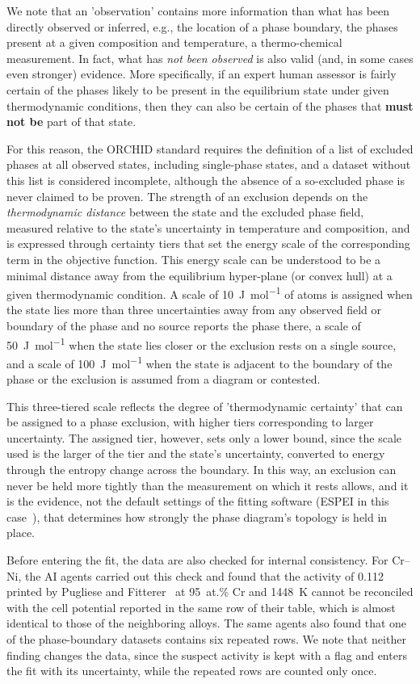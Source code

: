 We note that an 'observation' contains more information than what has been directly observed or inferred, e.g., the location of a phase boundary, the phases present at a given composition and temperature, a thermo-chemical measurement. In fact, what has \emph{not been observed} is also valid (and, in some cases even stronger) evidence. More specifically, if an expert human assessor is fairly certain of the phases likely to be present in the equilibrium state under given thermodynamic conditions, then they can also be certain of the phases that \textbf{must not be} part of that state. 

For this reason, the ORCHID standard requires the definition of a list of excluded phases at all observed states, including single-phase states, and a dataset without this list is considered incomplete, although the absence of a so-excluded phase is never claimed to be proven. The strength of an exclusion depends on the \emph{thermodynamic distance} between the state and the excluded phase field, measured relative to the state's uncertainty in temperature and composition, and is expressed through certainty tiers that set the energy scale of the corresponding term in the objective function. This energy scale can be understood to be a minimal distance away from the equilibrium hyper-plane (or convex hull) at a given thermodynamic condition. A scale of \qty{10}{\J\per\mole} of atoms is assigned when the state lies more than three uncertainties away from any observed field or boundary of the phase and no source reports the phase there, a scale of \qty{50}{\J\per\mole} when the state lies closer or the exclusion rests on a single source, and a scale of \qty{100}{\J\per\mole} when the state is adjacent to the boundary of the phase or the exclusion is assumed from a diagram or contested. 

This three-tiered scale reflects the degree of 'thermodynamic certainty' that can be assigned to a phase exclusion, with higher tiers corresponding to larger uncertainty. The assigned tier, however, sets only a lower bound, since the scale used is the larger of the tier and the state's uncertainty, converted to energy through the entropy change across the boundary. In this way, an exclusion can never be held more tightly than the measurement on which it rests allows, and it is the evidence, not the default settings of the fitting software (ESPEI in this case~\cite{bocklund2019espei}), that determines how strongly the phase diagram's topology is held in place.

Before entering the fit, the data are also checked for internal consistency. For Cr--Ni, the AI agents carried out this check and found that the activity of 0.112 printed by Pugliese and Fitterer~\cite{pugliese1970} at 95~at.\% Cr and \qty{1448}{\K} cannot be reconciled with the cell potential reported in the same row of their table, which is almost identical to those of the neighboring alloys. The same agents also found that one of the phase-boundary datasets contains six repeated rows. We note that neither finding changes the data, since the suspect activity is kept with a flag and enters the fit with its uncertainty, while the repeated rows are counted only once.

